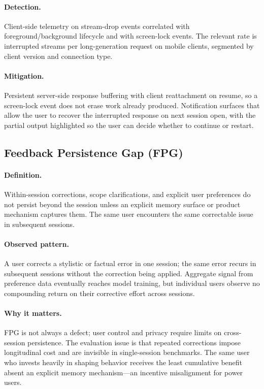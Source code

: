 \documentclass[11pt]{article}
\begin{document}
\paragraph{Detection.} Client-side telemetry on stream-drop events correlated with foreground/background lifecycle and with screen-lock events. The relevant rate is interrupted streams per long-generation request on mobile clients, segmented by client version and connection type.

\paragraph{Mitigation.} Persistent server-side response buffering with client reattachment on resume, so a screen-lock event does not erase work already produced. Notification surfaces that allow the user to recover the interrupted response on next session open, with the partial output highlighted so the user can decide whether to continue or restart.

\subsection{Feedback Persistence Gap (FPG)}
\paragraph{Definition.} Within-session corrections, scope clarifications, and explicit user preferences do not persist beyond the session unless an explicit memory surface or product mechanism captures them. The same user encounters the same correctable issue in subsequent sessions.

\paragraph{Observed pattern.} A user corrects a stylistic or factual error in one session; the same error recurs in subsequent sessions without the correction being applied. Aggregate signal from preference data eventually reaches model training, but individual users observe no compounding return on their corrective effort across sessions.

\paragraph{Why it matters.} FPG is not always a defect; user control and privacy require limits on cross-session persistence. The evaluation issue is that repeated corrections impose longitudinal cost and are invisible in single-session benchmarks. The same user who invests heavily in shaping behavior receives the least cumulative benefit absent an explicit memory mechanism---an incentive misalignment for power users.
\end{document}
